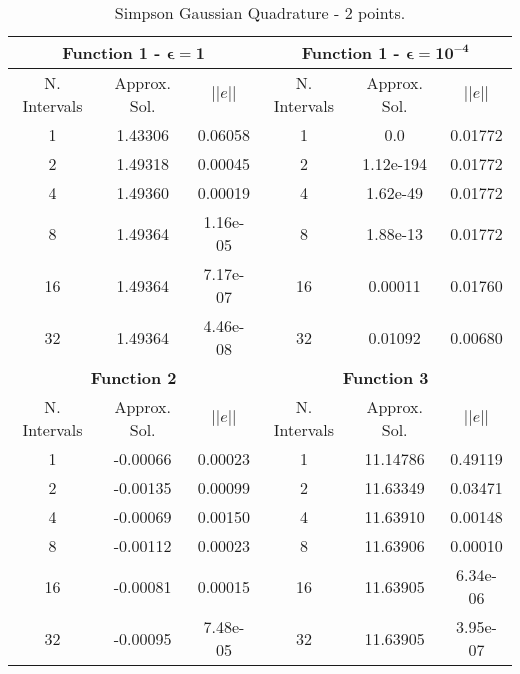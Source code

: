 \begin{table}[H]
    \centering
    \caption{Simpson Gaussian Quadrature - 2 points.}
    \begin{tabular}{ccc|ccc}
    \hline
    \multicolumn{3}{c}{\textbf{Function 1  -} $\bm{\epsilon = 1}$} & \multicolumn{3}{c}{\textbf{Function 1 -} $\bm{\epsilon = 10^{-4}}$} \\ \hline
    N. Intervals & Approx. Sol. & $|| e ||$ & N. Intervals & Approx. Sol. & $|| e ||$ \\ \hline
    1 & 1.43306 & 0.06058 & 1 & 0.0 & 0.01772 \\ 
    2 & 1.49318 & 0.00045 & 2 & 1.12e-194 & 0.01772 \\
    4 & 1.49360 & 0.00019 & 4 & 1.62e-49 & 0.01772 \\
    8 & 1.49364 & 1.16e-05 & 8 & 1.88e-13 & 0.01772 \\
    16 & 1.49364 & 7.17e-07 & 16 & 0.00011 & 0.01760 \\
    32 & 1.49364 & 4.46e-08 & 32 & 0.01092 & 0.00680  \\ \hline
    \multicolumn{3}{c}{\textbf{Function 2}} & \multicolumn{3}{c}{\bf{Function 3}} \\ \hline
    N. Intervals & Approx. Sol. & $|| e ||$ & N. Intervals & Approx. Sol. & $|| e ||$ \\ \hline
    1 & -0.00066 & 0.00023 & 1 & 11.14786 & 0.49119 \\
    2 & -0.00135 & 0.00099 & 2 & 11.63349 & 0.03471 \\
    4 & -0.00069 & 0.00150 & 4 & 11.63910 & 0.00148 \\
    8 & -0.00112 & 0.00023 & 8 & 11.63906 & 0.00010 \\
    16 & -0.00081 & 0.00015 & 16 & 11.63905 & 6.34e-06 \\
    32 & -0.00095 & 7.48e-05 & 32 & 11.63905 & 3.95e-07 \\ \hline
    \end{tabular}
\end{table}

